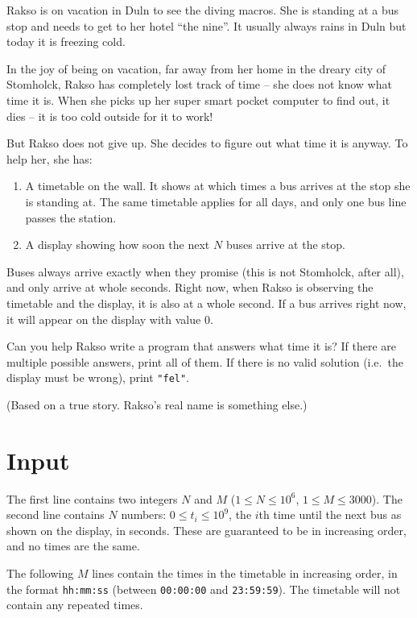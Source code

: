 Rakso is on vacation in Duln to see the diving macros. She is standing at a bus stop and needs to get to her hotel ``the nine''. It usually always rains in Duln but today it is freezing cold.

In the joy of being on vacation, far away from her home in the dreary city of Stomholck, Rakso has completely lost track of time -- she does not know what time it is. When she picks up her super smart pocket computer to find out, it dies -- it is too cold outside for it to work!

But Rakso does not give up. She decides to figure out what time it is anyway. To help her, she has:
\begin{enumerate}
  \item A timetable on the wall. It shows at which times a bus arrives at the stop she is standing at.
    The same timetable applies for all days, and only one bus line passes the station.
  \item A display showing how soon the next $N$ buses arrive at the stop.
\end{enumerate}
Buses always arrive exactly when they promise (this is not Stomholck, after all), and only arrive at whole seconds. Right now, when Rakso is observing the timetable and the display, it is also at a whole second. If a bus arrives right now, it will appear on the display with value $0$.

Can you help Rakso write a program that answers what time it is? If there are multiple possible answers, print all of them.
If there is no valid solution (i.e.\ the display must be wrong), print \texttt{"fel"}.

(Based on a true story. Rakso's real name is something else.)

\section*{Input}
The first line contains two integers $N$ and $M$ ($1 \leq N \leq 10^6$, $1 \leq M \leq 3000$).
The second line contains $N$ numbers: $0 \le t_i \le 10^9$, the $i$th time until the next bus as shown on the display, in seconds.
These are guaranteed to be in increasing order, and no times are the same.

The following $M$ lines contain the times in the timetable in increasing order, in the format \texttt{hh:mm:ss} (between \texttt{00:00:00} and \texttt{23:59:59}).
The timetable will not contain any repeated times.

